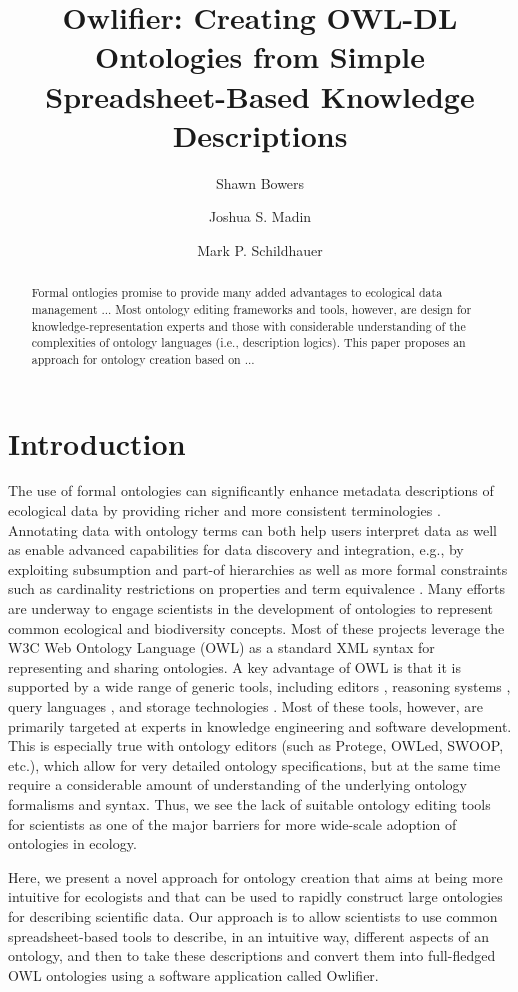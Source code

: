 \documentclass[preprint,number]{elsarticle}
\title{Owlifier: Creating OWL-DL Ontologies from Simple
  Spreadsheet-Based Knowledge Descriptions\tnoteref{t1}}
\author[smb]{Shawn Bowers\corref{cor1}}
\author[jsm]{Joshua S. Madin}
\author[mps]{Mark P. Schildhauer}
\newcommand{\owlifier}{\textsf{Owlifier}}
\begin{document}
\begin{abstract}
  Formal ontlogies promise to provide many added advantages to
  ecological data management ... Most ontology editing frameworks and
  tools, however, are design for knowledge-representation experts and
  those with considerable understanding of the complexities of
  ontology languages (i.e., description logics). This paper proposes
  an approach for ontology creation based on ...
\end{abstract}

\maketitle




\section{Introduction}


The use of formal ontologies can significantly enhance metadata
descriptions of ecological data by providing richer and more
consistent terminologies \cite{tree,arees,parr}. Annotating data with
ontology terms can both help users interpret data as well as enable
advanced capabilities for data discovery and integration, e.g., by
exploiting subsumption and part-of hierarchies as well as more formal
constraints such as cardinality restrictions on properties and term
equivalence \cite{ecoinf,other?}. Many efforts are underway to engage
scientists in the development of ontologies to represent common
ecological and biodiversity concepts. Most of these projects leverage
the W3C Web Ontology Language (OWL) as a standard XML syntax for
representing and sharing ontologies. A key advantage of OWL is that it
is supported by a wide range of generic tools, including editors
\cite{protege,swoop}, reasoning systems \cite{pellet,fact++}, query
languages \cite{???}, and storage technologies \cite{jena,???}. Most
of these tools, however, are primarily targeted at experts in
knowledge engineering and software development. This is especially
true with ontology editors (such as Protege, OWLed, SWOOP, etc.),
which allow for very detailed ontology specifications, but at the same
time require a considerable amount of understanding of the underlying
ontology formalisms and syntax. Thus, we see the lack of suitable
ontology editing tools for scientists as one of the major barriers for
more wide-scale adoption of ontologies in ecology.

Here, we present a novel approach for ontology creation that aims at
being more intuitive for ecologists and that can be used to rapidly
construct large ontologies for describing scientific data. Our
approach is to allow scientists to use common spreadsheet-based tools
to describe, in an intuitive way, different aspects of an ontology,
and then to take these descriptions and convert them into full-fledged
OWL ontologies using a software application called \owlifier. 
\end{document}
